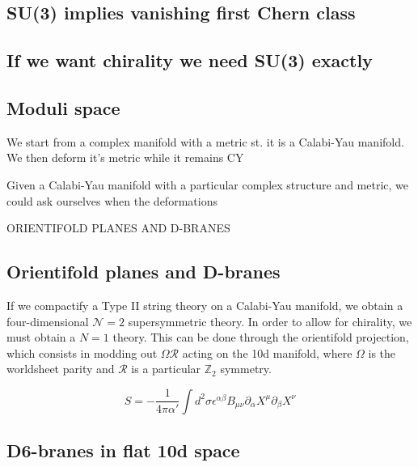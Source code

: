 \subsection{SU(3) implies vanishing first Chern class}

\subsection{If we want chirality we need SU(3) exactly}


\subsection{Moduli space}


We start from a complex manifold with a metric st. it is a Calabi-Yau manifold.
We then deform it's metric while it remains CY


Given a Calabi-Yau manifold with a particular complex structure and metric, we could ask ourselves
when the deformations


ORIENTIFOLD PLANES AND D-BRANES

\subsection{Orientifold planes and D-branes}

If we compactify a Type II string theory on a Calabi-Yau manifold, we  obtain a four-dimensional
$\mathcal N=2$ supersymmetric theory.
In order to allow for chirality, we must obtain a $N=1$ theory. This can be done through the orientifold
projection, which consists in modding out $\Omega \mathcal R$ acting on the 10d manifold, 
where $\Omega$ is the worldsheet parity and $\mathcal R$ is a particular $\mathbb Z_2$ symmetry.


\begin{equation}
  S= -\frac{1}{4\pi \alpha'}\int d^2\sigma \epsilon^{\alpha\beta} B_{\mu\nu}  \partial_\alpha X^\mu \partial_\beta X^\nu
\end{equation}

\subsection{D6-branes in flat 10d space}


